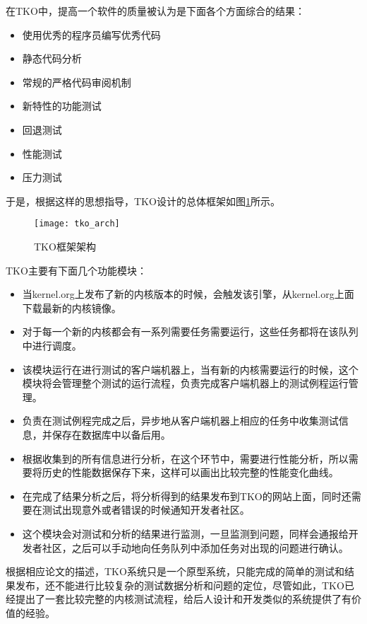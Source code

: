 在TKO中，提高一个软件的质量被认为是下面各个方面综合的结果：
\begin{itemize}
\item 使用优秀的程序员编写优秀代码
\item 静态代码分析
\item 常规的严格代码审阅机制
\item 新特性的功能测试
\item 回退测试
\item 性能测试
\item 压力测试
\end{itemize}
于是，根据这样的思想指导，TKO设计的总体框架如图\ref{fig:tko_arch}所示。

\begin{figure}[H]
\centering
\texttt{[image: tko\_arch]}
\caption{TKO框架架构}
\label{fig:tko_arch}
\end{figure}

TKO主要有下面几个功能模块：
\begin{itemize}
\item[\heiti{镜像触发引擎:}] 当kernel.org上发布了新的内核版本的时候，会触发该引擎，从kernel.org上面下载最新的内核镜像。
\item[\heiti{服务器工作队列:}] 对于每一个新的内核都会有一系列需要任务需要运行，这些任务都将在该队列中进行调度。
\item[\heiti{客户端管理:}] 该模块运行在进行测试的客户端机器上，当有新的内核需要运行的时候，这个模块将会管理整个测试的运行流程，负责完成客户端机器上的测试例程运行管理。
\item[\heiti{结果收集:}] 负责在测试例程完成之后，异步地从客户端机器上相应的任务中收集测试信息，并保存在数据库中以备后用。
\item[\heiti{结果分析:}] 根据收集到的所有信息进行分析，在这个环节中，需要进行性能分析，所以需要将历史的性能数据保存下来，这样可以画出比较完整的性能变化曲线。
\item[\heiti{结果发布:}] 在完成了结果分析之后，将分析得到的结果发布到TKO的网站上面，同时还需要在测试出现意外或者错误的时候通知开发者社区。
\item[\heiti{问题监测:}] 这个模块会对测试和分析的结果进行监测，一旦监测到问题，同样会通报给开发者社区，之后可以手动地向任务队列中添加任务对出现的问题进行确认。
\end{itemize}

根据相应论文的描述，TKO系统只是一个原型系统，只能完成的简单的测试和结果发布，还不能进行比较复杂的测试数据分析和问题的定位，尽管如此，TKO已经提出了一套比较完整的内核测试流程，给后人设计和开发类似的系统提供了有价值的经验。


